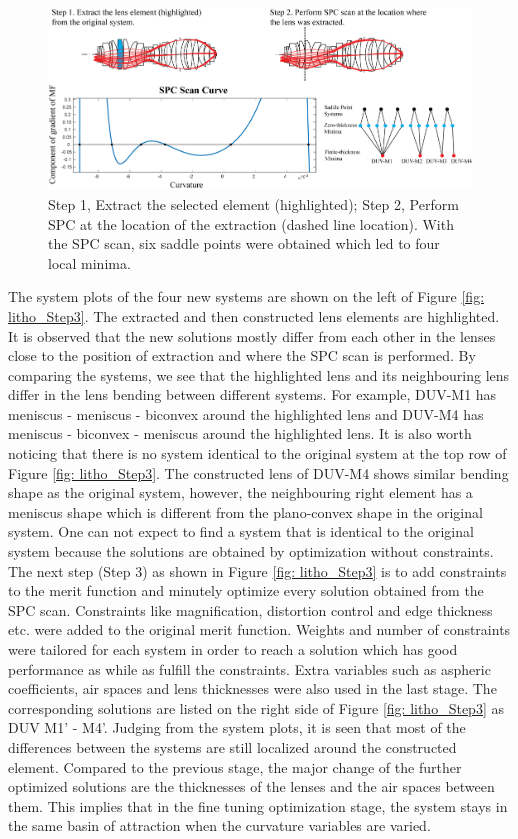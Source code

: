 \begin{figure}[h!]
    \centering
    \includegraphics[width=\textwidth]{chapter-4/figures/Litho_Step1_2.png}
    \caption{Step 1, Extract the selected element (highlighted); Step 2, Perform SPC at the location of the extraction (dashed line location). With the SPC scan, six saddle points were obtained which led to four local minima. }
    \label{fig: litho_step1_2}
\end{figure}

The system plots of the four new systems are shown on the left of Figure \ref{fig: litho_Step3}. The extracted and then constructed lens elements are highlighted. It is observed that the new solutions mostly differ from each other in the lenses close to the position of extraction and where the SPC scan is performed. By comparing the systems, we see that the highlighted lens and its neighbouring lens differ in the lens bending between different systems. For example, DUV-M1 has meniscus - meniscus - biconvex around the highlighted lens and DUV-M4 has meniscus - biconvex - meniscus around the highlighted lens. It is also worth noticing that there is no system identical to the original system at the top row of Figure \ref{fig: litho_Step3}. The constructed lens of DUV-M4 shows similar bending shape as the original system, however, the neighbouring right element has a meniscus shape which is different from the plano-convex shape in the original system. One can not expect to find a system that is identical to the original system because the solutions are obtained by optimization without constraints. The next step (Step 3) as shown in Figure \ref{fig: litho_Step3} is to add constraints to the merit function and minutely optimize every solution obtained from the SPC scan. Constraints like magnification, distortion control and edge thickness etc. were added to the original merit function. Weights and number of constraints were tailored for each system in order to reach a solution which has good performance as while as fulfill the constraints. Extra variables such as aspheric coefficients, air spaces and lens thicknesses were also used in the last stage. The corresponding solutions are listed on the right side of Figure \ref{fig: litho_Step3} as DUV M1' - M4'. Judging from the system plots, it is seen that most of the differences between the systems are still localized around the constructed element. Compared to the previous stage, the major change of the further optimized solutions are the thicknesses of the lenses and the air spaces between them. This implies that in the fine tuning optimization stage, the system stays in the same basin of attraction when the curvature variables are varied.


